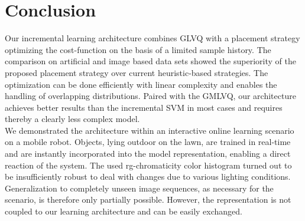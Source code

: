 \documentclass[conference]{IEEEtran}
\begin{document}
\section{Conclusion}
Our incremental learning architecture combines GLVQ with a placement strategy optimizing the cost-function on the basis of a limited sample history.
The comparison on artificial and image based data sets showed the superiority of the proposed placement strategy over current heuristic-based strategies.
The optimization can be done efficiently with linear complexity and enables the handling of overlapping distributions. 
Paired with the GMLVQ, our architecture achieves better results than the incremental SVM in most cases and requires thereby a clearly less complex model.\\
We demonstrated the architecture within an interactive online learning scenario on a mobile robot. Objects, lying outdoor on the lawn, are trained in real-time 
and are instantly incorporated into the model representation, enabling a direct reaction of the system.
The used rg-chromaticity color histogram turned out to be insufficiently robust to deal with changes due to
various lighting conditions. Generalization to completely unseen image sequences, as necessary for the scenario, is therefore only partially possible. 
However, the representation is not coupled to our learning architecture and can be easily exchanged.
\newpage



%
%
%



\end{document}
